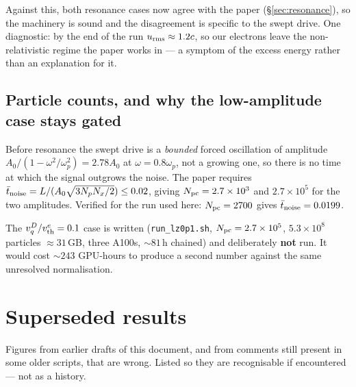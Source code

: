 \documentclass[11pt,a4paper]{article}
\newcommand{\code}[1]{\texttt{\small #1}}
\newcommand{\vth}{v_{\rm th}^{e}}
\newcommand{\Npc}{N_{\rm pc}}
\begin{document}
Against this, both resonance cases now agree with the paper (\S\ref{sec:resonance}),
so the machinery is sound and the disagreement is specific to the swept drive. One
diagnostic: by the end of the run $u_{\rm rms}\approx1.2c$, so our electrons leave the
non-relativistic regime the paper works in --- a symptom of the excess energy rather
than an explanation for it.

\subsection{Particle counts, and why the low-amplitude case stays gated}

Before resonance the swept drive is a \emph{bounded} forced oscillation of amplitude
$A_0/(1-\omega^2/\omega_p^2) = 2.78A_0$ at $\omega = 0.8\omega_p$, not a growing one,
so there is no time at which the signal outgrows the noise. The paper requires
$\bar t_{\rm noise} = L/(A_0\sqrt{3N_pN_x/2}) \le 0.02$, giving $\Npc = 2.7\times10^3$
and $2.7\times10^5$ for the two amplitudes. Verified for the run used here:
$\Npc = 2700$ gives $\bar t_{\rm noise} = 0.0199$.

The $v_q^D/\vth = 0.1$ case is written (\code{run\_lz0p1.sh}, $\Npc = 2.7\times10^5$,
$5.3\times10^8$ particles ${\approx}31$\,GB, three A100s, ${\sim}81$\,h chained) and
deliberately \textbf{not} run. It would cost ${\sim}243$ GPU-hours to produce a second
number against the same unresolved normalisation.

\section{Superseded results}
\label{sec:corrections}

Figures from earlier drafts of this document, and from comments still present in some
older scripts, that are wrong. Listed so they are recognisable if encountered --- not
as a history.
\end{document}
